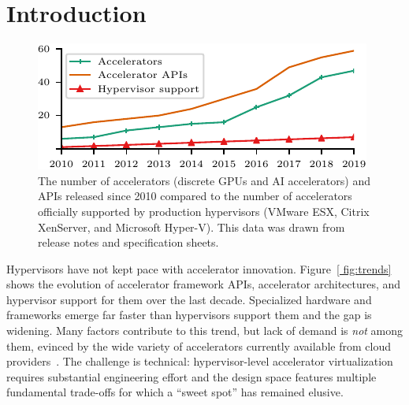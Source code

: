 
\section{Introduction}
\label{s:intro}

\begin{figure}[!htp]
	\centering
	\includegraphics[width=0.7\linewidth]{ava/data/technology_trend/technology_trend.pdf}%
	\caption{The number of accelerators (discrete GPUs and AI
      accelerators) and APIs released since 2010 compared to the number of accelerators officially supported by production hypervisors (VMware ESX, Citrix XenServer, and Microsoft Hyper-V).
      This data was drawn from release notes and specification sheets.
  }
	\label{fig:trends}
\end{figure}

Hypervisors have not kept pace with accelerator innovation. Figure~\ref{
fig:trends} shows the evolution of accelerator framework APIs, accelerator
architectures, and hypervisor support for them over the last decade.
Specialized hardware and frameworks emerge far faster than hypervisors support
them and the gap is widening. Many factors contribute to this trend, but lack
of demand is \emph{not} among them, evinced by the wide variety of
accelerators currently available from cloud providers~\cite{amazon_ec2,
google-gpu,google-cmle,gpucloud,amazon_f1,olympus,cloud-tpu}.
The challenge is technical: hypervisor-level accelerator virtualization
requires substantial engineering effort and the design space features multiple
fundamental trade-offs for which a ``sweet spot'' has remained elusive.

